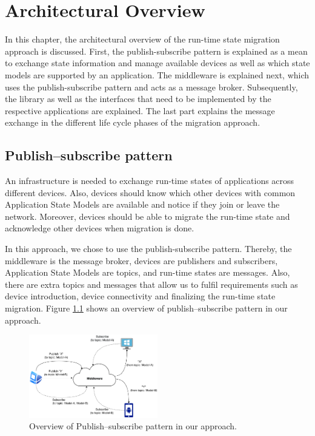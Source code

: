 \chapter{Architectural Overview}
\label{ch:architectural_overview}
In this chapter, the architectural overview of the run-time state migration approach is discussed. First, the publish-subscribe pattern is explained as a mean to exchange state information and manage available devices as well as which state models are supported by an application. The middleware is explained next, which uses the publish-subscribe pattern and acts as a message broker. Subsequently, the library as well as the interfaces that need to be implemented by the respective applications are explained. The last part explains the message exchange in the different life cycle phases of the migration approach.

\section{Publish–subscribe pattern}
An infrastructure is needed to exchange run-time states of applications across different devices. Also, devices should know which other devices with common Application State Models are available and notice if they join or leave the network. Moreover, devices should be able to migrate the run-time state and acknowledge other devices when migration is done.

In this approach, we chose to use the publish-subscribe pattern. Thereby, the middleware is the message broker, devices are publishers and subscribers, Application State Models are topics, and run-time states are messages. Also, there are extra topics and messages that allow us to fulfil requirements such as device introduction, device connectivity and finalizing the run-time state migration. Figure \ref{fig:publish–subscribe} shows an overview of publish–subscribe pattern in our approach.

\vspace{10mm}
\FloatBarrier \begin{figure}[H]
    \includegraphics[width=0.5\textwidth]{../figures/publish-subscribe.pdf}
    \centering
    \caption{Overview of Publish–subscribe pattern in our approach.}
    \label{fig:publish–subscribe}
\end{figure} \FloatBarrier

